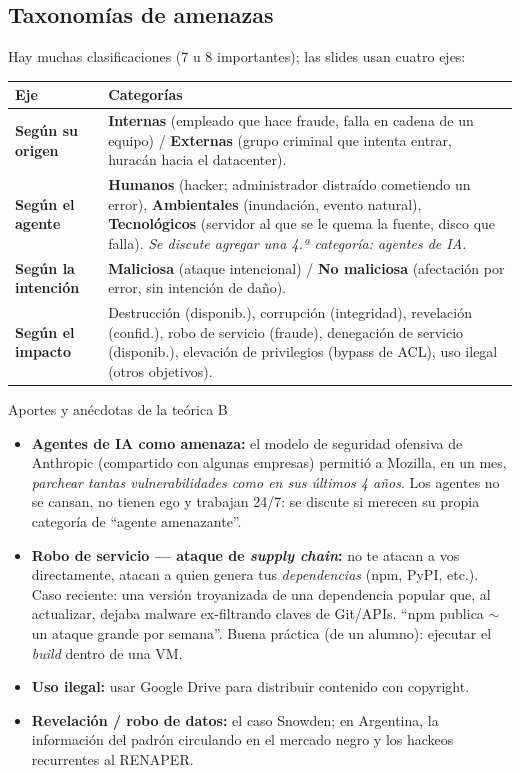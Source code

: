 \documentclass[11pt,a4paper]{article}
\begin{document}
\subsection{Taxonomías de amenazas}
Hay muchas clasificaciones (7 u 8 importantes); las slides usan cuatro ejes:

\begin{center}
\renewcommand{\arraystretch}{1.25}
\begin{tabular}{>{\bfseries}p{3.0cm} p{11.0cm}}
\toprule
Eje & Categorías \\
\midrule
Según su origen & \textbf{Internas} (empleado que hace fraude, falla en cadena de un equipo) /
  \textbf{Externas} (grupo criminal que intenta entrar, huracán hacia el datacenter).\\
Según el agente & \textbf{Humanos} (hacker; administrador distraído cometiendo un error),
  \textbf{Ambientales} (inundación, evento natural), \textbf{Tecnológicos} (servidor al que se
  le quema la fuente, disco que falla). \emph{Se discute agregar una 4.ª categoría: agentes de
  IA.}\\
Según la intención & \textbf{Maliciosa} (ataque intencional) / \textbf{No maliciosa}
  (afectación por error, sin intención de daño).\\
Según el impacto & Destrucción (disponib.), corrupción (integridad), revelación (confid.), robo
  de servicio (fraude), denegación de servicio (disponib.), elevación de privilegios (bypass de
  ACL), uso ilegal (otros objetivos).\\
\bottomrule
\end{tabular}
\end{center}

\begin{practbox}{Aportes y anécdotas de la teórica B}
\begin{itemize}[leftmargin=1.3em,itemsep=2pt]
  \item \textbf{Agentes de IA como amenaza:} el modelo de seguridad ofensiva de Anthropic
        (compartido con algunas empresas) permitió a Mozilla, en un mes, \emph{parchear tantas
        vulnerabilidades como en sus últimos 4 años}. Los agentes no se cansan, no tienen ego y
        trabajan 24/7: se discute si merecen su propia categoría de ``agente amenazante''.
  \item \textbf{Robo de servicio — ataque de \emph{supply chain}:} no te atacan a vos
        directamente, atacan a quien genera tus \emph{dependencias} (npm, PyPI, etc.). Caso
        reciente: una versión troyanizada de una dependencia popular que, al actualizar, dejaba
        malware ex-filtrando claves de Git/APIs. ``npm publica $\sim$un ataque grande por
        semana''. Buena práctica (de un alumno): ejecutar el \emph{build} dentro de una VM.
  \item \textbf{Uso ilegal:} usar Google Drive para distribuir contenido con copyright.
  \item \textbf{Revelación / robo de datos:} el caso Snowden; en Argentina, la información del
        padrón circulando en el mercado negro y los hackeos recurrentes al RENAPER.
\end{itemize}
\end{practbox}
\end{document}
